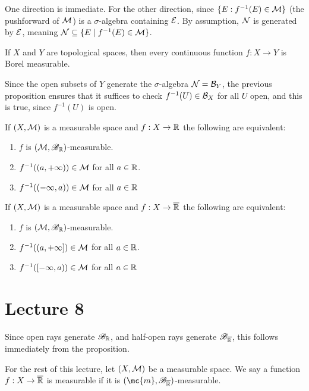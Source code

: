 \documentclass[x11names,reqno,14pt]{extarticle}
\newcommand*{\oo}{\infty}
\begin{document}
\proof

One direction is immediate. For the other direction, since $\{E: f^{-1}(E) \in \mathcal{M}\}$ (the pushforward of $\mathcal{M}$) is a $\sigma$-algebra containing $\mathcal{E}$. By assumption, $\mathcal{N}$ is generated by $\mathcal{E}$, meaning $\mathcal{N} \subseteq \{E \mid f^{-1}(E) \in \mathcal{M} \}$. 

\cor

If $X$ and $Y$ are topological spaces, then every continuous function $f:X\to Y$ is Borel measurable. 

\proof 

Since the open subsets of $Y$ generate the $\sigma$-algebra $\mathcal{N} = \mathcal{B}_Y$, the previous proposition ensures that it suffices to check $f^{-1}(U)\in\mathcal{B}_X$ for all $U$ open, and this is true, since $f^{-1}(U)$ is open. 

\cor

If $(X, \mathcal{M})$ is a measurable space and $f:X\to\mathbb{R}$ the following are equivalent: 
\begin{enumerate}[label=(\roman*)]
\item $f$ is $(\mathcal{M}, \mathscr{B}_{\mathbb{R}})$-measurable. 
\item $f^{-1}((a, + \oo))\in\mc{M}$ for all $a \in \mathbb{R}$. 
\item $f^{-1}((-\oo, a)) \in \mc{M}$ for all $a \in \mathbb{R}$
\end{enumerate}

If $(X, \mathcal{M})$ is a measurable space and $f:X\to\overline{\mathbb{R}}$ the following are equivalent: 
\begin{enumerate}[label=(\roman*)]
\item $f$ is $(\mathcal{M}, \mathscr{B}_{\mathbb{R}})$-measurable. 
\item $f^{-1}((a, + \oo])\in\mc{M}$ for all $a \in \mathbb{R}$. 
\item $f^{-1}([-\oo, a)) \in \mc{M}$ for all $a \in \mathbb{R}$
\end{enumerate}

\section*{Lecture 8}

\proof

Since open rays generate $\mathscr{B}_{\mathbb{R}}$, and half-open rays generate $\mathscr{B}_{\overline{\mathbb{R}}}$, this follows immediately from the proposition.

For the rest of this lecture, let $(X, \mathcal{M})$ be a measurable space. We say a function $f:X\to\overline{\mathbb{R}}$ is measurable if it is $(\mc{m}, \ms{B}_{\bar{\R}})$-measurable. 
\end{document}

